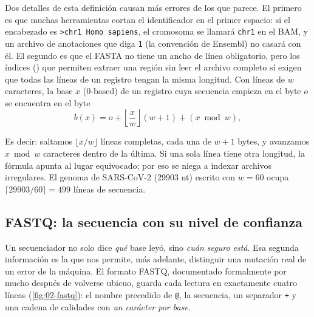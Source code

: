Dos detalles de esta definición causan más errores de los que parece. El primero es que muchas herramientas cortan el identificador en el primer espacio: si el encabezado es \texttt{>chr1 Homo sapiens}, el cromosoma se llamará \texttt{chr1} en el BAM, y un archivo de anotaciones que diga \texttt{1} (la convención de Ensembl) no casará con él. El segundo es que el FASTA no tiene un ancho de línea obligatorio, pero los índices () que permiten extraer una región sin leer el archivo completo sí exigen que todas las líneas de un registro tengan la misma longitud. Con líneas de $w$ caracteres, la base $x$ (0-based) de un registro cuya secuencia empieza en el byte $o$ se encuentra en el byte
\begin{equation}\label{eq:02-fai}
b(x) = o + \left\lfloor \frac{x}{w} \right\rfloor (w+1) + (x \bmod w),
\end{equation}
\begin{simbolos}
\end{simbolos}
Es decir: saltamos $\lfloor x/w\rfloor$ líneas completas, cada una de $w+1$ bytes, y avanzamos $x \bmod w$ caracteres dentro de la última. Si una sola línea tiene otra longitud, la fórmula apunta al lugar equivocado; por eso  se niega a indexar archivos irregulares. El genoma de SARS-CoV-2 (\num{29903} nt) escrito con $w=60$ ocupa $\lceil \num{29903}/60\rceil = 499$ líneas de secuencia.

\subsection{FASTQ: la secuencia con su nivel de confianza}

Un secuenciador no solo dice \emph{qué} base leyó, sino \emph{cuán seguro está}. Esa segunda información es la que nos permite, más adelante, distinguir una mutación real de un error de la máquina. El formato FASTQ, documentado formalmente por \textcite{c02-cock2010} mucho después de volverse ubicuo, guarda cada lectura en exactamente cuatro líneas (\cref{fig:02-fastq}): el nombre precedido de \texttt{@}, la secuencia, un separador \texttt{+} y una cadena de calidades con \emph{un carácter por base}.

